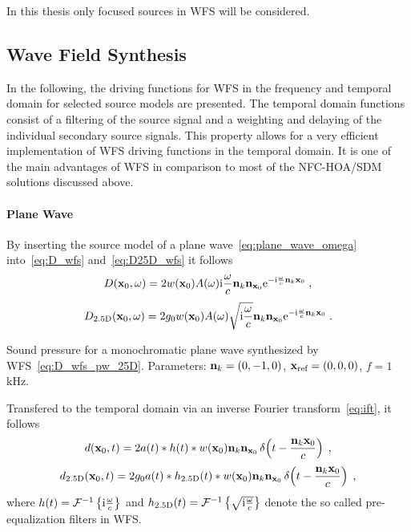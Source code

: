 In this thesis only focused sources in \ac{WFS} will be considered.


\subsection{Wave Field Synthesis}
\label{sec:driving_functions_wfs}

In the following, the driving functions for \ac{WFS} in the frequency and
temporal domain
for selected source models are presented. The temporal domain
functions consist of a filtering of the source signal and a weighting and
delaying of the individual secondary source signals. This property allows for a very efficient
implementation of \ac{WFS} driving functions in the temporal domain.
It is one of the main advantages of \ac{WFS} in comparison
to most of the \ac{NFC-HOA}/\ac{SDM} solutions discussed above.

\paragraph{Plane Wave}
%
%
By inserting the source model of a plane wave~\eqref{eq:plane_wave_omega}
into~\eqref{eq:D_wfs} and~\eqref{eq:D25D_wfs} it follows
%
\begin{equation}
    D(\x_0,\omega) = 2 w(\x_0) A(\omega) \I\omegac \n_k\n_{\x_0}
    \E^{-\I\omegac\n_k\x_0} \qc
    \label{eq:D_wfs_pw}
\end{equation}
%
\begin{equation}
    D_\twohalfD(\x_0,\omega) = 2g_0 w(\x_0) A(\omega) \sqrt{\I\omegac} \n_k\n_{\x_0} 
    \E^{-\I\omegac\n_k\x_0} \qp
    \label{eq:D_wfs_pw_25D}
\end{equation}
%
\begin{marginfigure}[-0.5cm]
    \centering
    \ft
    
    \caption{Sound pressure for a monochromatic plane wave synthesized by
        \twohalfD \ac{WFS}~\eqref{eq:D_wfs_pw_25D}. Parameters: $\mathbf{n}_k = (0,-1,0)$, $\mathbf{x}_\text{ref}
        = (0,0,0)$, $f = 1$\,kHz.
        }
\end{marginfigure}
%
Transfered to the temporal domain via an inverse Fourier
transform~\eqref{eq:ift}, it follows
%
\begin{equation}
    d(\x_0,t) = 2 a(t) * h(t) * w(\x_0) \n_k \n_{\x_0} \deltafunc{t -
    \frac{\n_k\x_0}{c}} \qc
    \label{eq:d_wfs_pw}
\end{equation}
%
\begin{equation}
    d_\twohalfD(\x_0,t) = 2g_0 a(t) * h_\twohalfD(t) * w(\x_0) \n_k \n_{\x_0}
    \deltafunc{t - \frac{\n_k\x_0}{c}} \qc
    \label{eq:d_wfs_pw_25D}
\end{equation}
%
where $h(t) =  \mathcal{F}^{-1}\left\{\mathrm{i}\frac{\omega}{c}\right\}$ and $h_{2.5\text{D}}(t) =  \mathcal{F}^{-1}\left\{\sqrt{\mathrm{i}\frac{\omega}{c}}\right\}$
denote the so called pre-equalization filters in \ac{WFS}.

